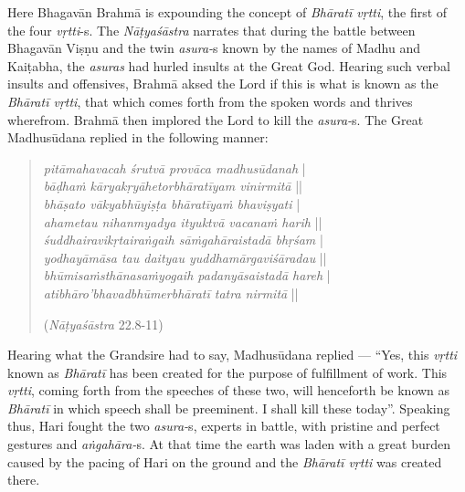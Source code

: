 Here Bhagavān Brahmā is expounding the concept of \textsl{Bhāratī vṛtti}, the first of the four \textsl{vṛtti}-s. The \textsl{Nāṭyaśāstra} narrates that during the battle between Bhagavān Viṣṇu and the twin \textsl{asura-}s known by the names of Madhu and Kaiṭabha, the \textsl{asuras} had hurled insults at the Great God. Hearing such verbal insults and offensives, Brahmā aksed the Lord if this is what is known as the \textsl{Bhāratī vṛtti}, that which comes forth from the spoken words and thrives wherefrom. Brahmā then implored the Lord to kill the \textsl{asura-}s. The Great Madhusūdana replied in the following manner:
\begin{quote}
\textsl{pitāmahavacah śrutvā provāca madhusūdanah} |\\
\textsl{bāḍhaṁ kāryakṛyāhetorbhāratīyam vinirmitā} ||\\
\textsl{bhāṣato vākyabhūyiṣṭa bhāratīyaṁ bhaviṣyati} |\\
\textsl{ahametau nihanmyadya ityuktvā vacanaṁ harih} ||\\
\textsl{śuddhairavikṛtairaṅgaih sāṁgahāraistadā bhṛśam} |\\
\textsl{yodhayāmāsa tau daityau yuddhamārgaviśāradau} ||\\
\textsl{bhūmisaṁsthānasaṁyogaih padanyāsaistadā hareh} |\\
\textsl{atibhāro’bhavadbhūmerbhāratī tatra nirmitā} ||

\hfill (\textsl{Nāṭyaśāstra} 22.8-11)
\end{quote}

Hearing what the Grandsire had to say, Madhusūdana replied --- “Yes, this \textsl{vṛtti} known as \textsl{Bhāratī} has been created for the purpose of fulfillment of work. This \textsl{vṛtti}, coming forth from the speeches of these two, will henceforth be known as \textsl{Bhāratī} in which speech shall be preeminent. I shall kill these today”. Speaking thus, Hari fought the two \textsl{asura-}s, experts in battle, with pristine and perfect gestures and \textsl{aṅgahāra-}s. At that time the earth was laden with a great burden caused by the pacing of Hari on the ground and the \textsl{Bhāratī vṛtti} was created there. 

